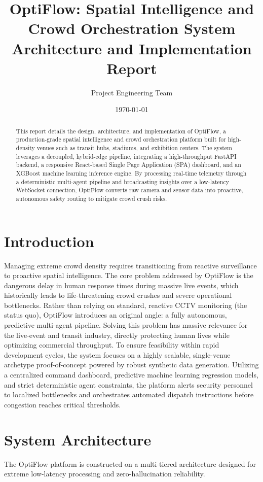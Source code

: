 \documentclass[11pt, a4paper]{article}
\title{\textbf{OptiFlow: Spatial Intelligence and Crowd Orchestration System}\\
\large Architecture and Implementation Report}
\author{Project Engineering Team}
\date{\today}
\begin{document}
\maketitle

\begin{abstract}
This report details the design, architecture, and implementation of OptiFlow, a production-grade spatial intelligence and crowd orchestration platform built for high-density venues such as transit hubs, stadiums, and exhibition centers. The system leverages a decoupled, hybrid-edge pipeline, integrating a high-throughput FastAPI backend, a responsive React-based Single Page Application (SPA) dashboard, and an XGBoost machine learning inference engine. By processing real-time telemetry through a deterministic multi-agent pipeline and broadcasting insights over a low-latency WebSocket connection, OptiFlow converts raw camera and sensor data into proactive, autonomous safety routing to mitigate crowd crush risks.
\end{abstract}

\section{Introduction}
Managing extreme crowd density requires transitioning from reactive surveillance to proactive spatial intelligence. The core problem addressed by OptiFlow is the dangerous delay in human response times during massive live events, which historically leads to life-threatening crowd crushes and severe operational bottlenecks. Rather than relying on standard, reactive CCTV monitoring (the status quo), OptiFlow introduces an original angle: a fully autonomous, predictive multi-agent pipeline. Solving this problem has massive relevance for the live-event and transit industry, directly protecting human lives while optimizing commercial throughput. To ensure feasibility within rapid development cycles, the system focuses on a highly scalable, single-venue archetype proof-of-concept powered by robust synthetic data generation. Utilizing a centralized command dashboard, predictive machine learning regression models, and strict deterministic agent constraints, the platform alerts security personnel to localized bottlenecks and orchestrates automated dispatch instructions before congestion reaches critical thresholds.

\section{System Architecture}
The OptiFlow platform is constructed on a multi-tiered architecture designed for extreme low-latency processing and zero-hallucination reliability.
\end{document}
